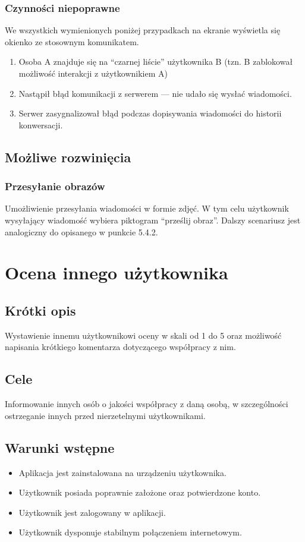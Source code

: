 \documentclass[12pt,a4paper,twoside]{article}
\begin{document}
    \subsubsection{Czynności niepoprawne}
    We wszystkich wymienionych poniżej przypadkach na ekranie wyświetla się okienko ze stosownym komunikatem.
    \begin{enumerate}
        \item Osoba A znajduje się na ``czarnej liście'' użytkownika B (tzn. B zablokował możliwość interakcji z użytkownikiem A)
        \item Nastąpił błąd komunikacji z serwerem --- nie udało się wysłać wiadomości.
        \item Serwer zasygnalizował błąd podczas dopisywania wiadomości do historii konwersacji.
    \end{enumerate}
    
    
    \subsection{Możliwe rozwinięcia}
    \subsubsection{Przesyłanie obrazów}
    Umożliwienie przesyłania wiadomości w formie zdjęć. W tym celu użytkownik wysyłający wiadomość wybiera piktogram ``prześlij obraz''. Dalszy scenariusz jest analogiczny do opisanego w punkcie 5.4.2.
    
    \section{Ocena innego użytkownika}
    
    \subsection{Krótki opis}
    Wystawienie innemu użytkownikowi oceny w skali od 1 do 5 oraz możliwość napisania krótkiego komentarza dotyczącego współpracy z nim.
    
    
    \subsection{Cele}
    Informowanie innych osób o jakości współpracy z daną osobą, w szczególności ostrzeganie innych przed nierzetelnymi użytkownikami.
    
    
    \subsection{Warunki wstępne}
    \begin{itemize}
        \item Aplikacja jest zainstalowana na urządzeniu użytkownika.
        \item Użytkownik posiada poprawnie założone oraz potwierdzone konto.
        \item Użytkownik jest zalogowany w aplikacji.
        \item Użytkownik dysponuje stabilnym połączeniem internetowym.
    \end{itemize}
    
\end{document}
